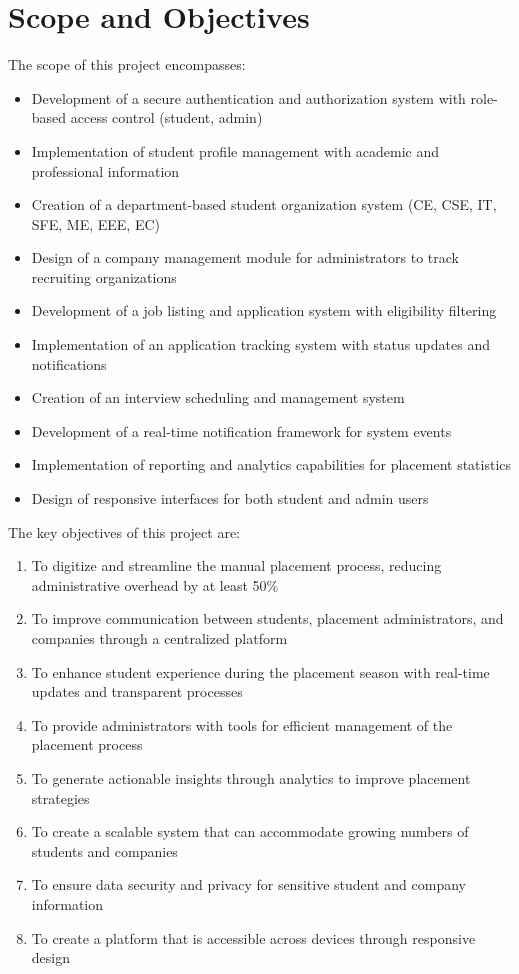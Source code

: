 \documentclass[12pt,a4paper]{report}
\begin{document}
\section{Scope and Objectives}
The scope of this project encompasses:
\begin{itemize}
    \item Development of a secure authentication and authorization system with role-based access control (student, admin)
    \item Implementation of student profile management with academic and professional information
    \item Creation of a department-based student organization system (CE, CSE, IT, SFE, ME, EEE, EC)
    \item Design of a company management module for administrators to track recruiting organizations
    \item Development of a job listing and application system with eligibility filtering
    \item Implementation of an application tracking system with status updates and notifications
    \item Creation of an interview scheduling and management system
    \item Development of a real-time notification framework for system events
    \item Implementation of reporting and analytics capabilities for placement statistics
    \item Design of responsive interfaces for both student and admin users
\end{itemize}

The key objectives of this project are:
\begin{enumerate}
    \item To digitize and streamline the manual placement process, reducing administrative overhead by at least 50\%
    \item To improve communication between students, placement administrators, and companies through a centralized platform
    \item To enhance student experience during the placement season with real-time updates and transparent processes
    \item To provide administrators with tools for efficient management of the placement process
    \item To generate actionable insights through analytics to improve placement strategies
    \item To create a scalable system that can accommodate growing numbers of students and companies
    \item To ensure data security and privacy for sensitive student and company information
    \item To create a platform that is accessible across devices through responsive design
\end{enumerate}
\end{document}
